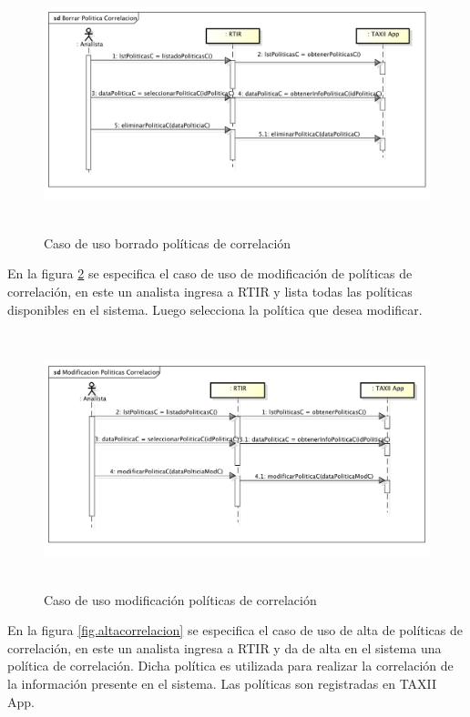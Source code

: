 \bigskip
\begin{figure}[H]
	\includegraphics[width=5.7634in,height=2.898in]{Analisis22-img/Analisis22-img020.png}
	\caption{Caso de uso borrado políticas de correlación} 
	\label{fig.borradocorrelacion}
\end{figure}

\bigskip

	En la figura \ref{fig.modificacioncorrelacion} se especifica el caso de uso de modificación de políticas de correlación, en este un analista ingresa a
	RTIR y lista todas las políticas disponibles en el sistema. Luego selecciona la política que desea modificar.

\begin{figure}[H]
	\centering
	\includegraphics[width=5.7638in,height=2.9256in]{Analisis22-img/Analisis22-img021.png} 
	\caption{Caso de uso modificación políticas de correlación}
	\label{fig.modificacioncorrelacion}
\end{figure}

\bigskip

	En la figura \ref{fig.altacorrelacion} se especifica el caso de uso de alta de políticas de correlación, en este un analista ingresa a RTIR y
	da de alta en el sistema una política de correlación. Dicha política es utilizada para realizar la correlación de la
	información presente en el sistema. Las políticas son registradas en TAXII App.
	
